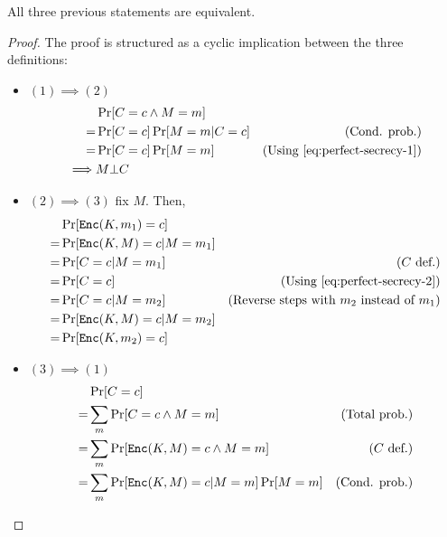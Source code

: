 \begin{proposition}
    All three previous statements are equivalent.
\end{proposition}
\begin{proof}
    The proof is structured as a cyclic implication between the three definitions:
%
    \begin{itemize}
    	\item $(1) \implies (2)$
        \begin{align*}
            & \Pr[C = c \wedge M = m] \\
            =& \Pr[C = c] \Pr[M = m|C = c] & \text{(Cond. prob.)} \\
            =& \Pr[C = c] \Pr[M = m] & \text{(Using \ref{eq:perfect-secrecy-1})} \\
            \implies& M \bot C
        \end{align*}
%
        \item $(2) \implies (3)$ fix $M$. Then,
        \begin{align*}
            & \Pr[\texttt{Enc}(K, m_1) = c] & \\
            =& \Pr[\texttt{Enc}(K, M) = c| M = m_1] & \\
            =& \Pr[C = c|M = m_1] & \text{($C$ def.)} \\
            =& \Pr[C = c] & \text{(Using \ref{eq:perfect-secrecy-2})} \\
            =& \Pr[C = c|M = m_2] & \text{(Reverse steps with $m_2$ instead of $m_1$)} \\
            =& \Pr[\texttt{Enc}(K, M) = c| M = m_2] & \\
            =& \Pr[\texttt{Enc}(K, m_2) = c] &
        \end{align*}
%
        \item $(3) \implies (1)$
        \begin{align*}
            & \Pr[C \evaluatesto c] & \\
            =& \sum_{m}\Pr[C \evaluatesto c \wedge M \evaluatesto m] & \text{(Total prob.)} \\
            =& \sum_{m}\Pr[\Enc(K, M) \evaluatesto c \wedge M \evaluatesto m] & \text{($C$ def.)} \\
            =& \sum_{m}\Pr[\Enc(K, M) \evaluatesto c|M \evaluatesto m]\Pr[M \evaluatesto m] & \text{(Cond. prob.)} \\

\end{align*}
\end{itemize}
\end{proof}
